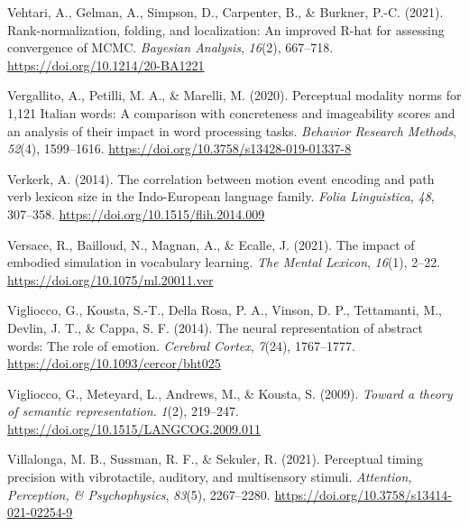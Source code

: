 \documentclass[
  12pt,
  man,floatsintext]{apa7}
\newlength{\cslhangindent}
\newlength{\cslentryspacingunit} %
\newenvironment{CSLReferences}[2] %
 {%
  \setlength{\parindent}{0pt}
  \ifodd #1
  \let\oldpar\par
  \def\par{\hangindent=\cslhangindent\oldpar}
  \fi
  \setlength{\parskip}{#2\cslentryspacingunit}
 }%
 {}
\begin{document}
\begin{CSLReferences}{1}{0}
\leavevmode{}%
Vehtari, A., Gelman, A., Simpson, D., Carpenter, B., \& Burkner, P.-C. (2021). Rank-normalization, folding, and localization: {An} improved {R-hat} for assessing convergence of {MCMC}. \emph{Bayesian Analysis}, \emph{16}(2), 667--718. \url{https://doi.org/10.1214/20-BA1221}

\leavevmode{}%
Vergallito, A., Petilli, M. A., \& Marelli, M. (2020). Perceptual modality norms for 1,121 {Italian} words: {A} comparison with concreteness and imageability scores and an analysis of their impact in word processing tasks. \emph{Behavior Research Methods}, \emph{52}(4), 1599--1616. \url{https://doi.org/10.3758/s13428-019-01337-8}

\leavevmode{}%
Verkerk, A. (2014). The correlation between motion event encoding and path verb lexicon size in the {Indo-European} language family. \emph{Folia Linguistica}, \emph{48}, 307--358. \url{https://doi.org/10.1515/flih.2014.009}

\leavevmode{}%
Versace, R., Bailloud, N., Magnan, A., \& Ecalle, J. (2021). The impact of embodied simulation in vocabulary learning. \emph{The Mental Lexicon}, \emph{16}(1), 2--22. \url{https://doi.org/10.1075/ml.20011.ver}

\leavevmode{}%
Vigliocco, G., Kousta, S.-T., Della Rosa, P. A., Vinson, D. P., Tettamanti, M., Devlin, J. T., \& Cappa, S. F. (2014). The neural representation of abstract words: The role of emotion. \emph{Cerebral Cortex}, \emph{7}(24), 1767--1777. \url{https://doi.org/10.1093/cercor/bht025}

\leavevmode{}%
Vigliocco, G., Meteyard, L., Andrews, M., \& Kousta, S. (2009). \emph{Toward a theory of semantic representation}. \emph{1}(2), 219--247. \url{https://doi.org/10.1515/LANGCOG.2009.011}

\leavevmode{}%
Villalonga, M. B., Sussman, R. F., \& Sekuler, R. (2021). Perceptual timing precision with vibrotactile, auditory, and multisensory stimuli. \emph{Attention, Perception, \& Psychophysics}, \emph{83}(5), 2267--2280. \url{https://doi.org/10.3758/s13414-021-02254-9}


\end{CSLReferences}
\end{document}
